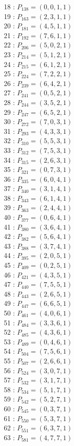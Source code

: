\documentclass{article}
\begin{document}
{\begin{multicols}{2}
18 : $P_{138}=( 0, 0, 1, 1 )$\\
19 : $P_{163}=( 2, 3, 1, 1 )$\\
20 : $P_{181}=( 4, 5, 1, 1 )$\\
21 : $P_{192}=( 7, 6, 1, 1 )$\\
22 : $P_{206}=( 5, 0, 2, 1 )$\\
23 : $P_{214}=( 5, 1, 2, 1 )$\\
24 : $P_{215}=( 6, 1, 2, 1 )$\\
25 : $P_{224}=( 7, 2, 2, 1 )$\\
26 : $P_{239}=( 6, 4, 2, 1 )$\\
27 : $P_{241}=( 0, 5, 2, 1 )$\\
28 : $P_{244}=( 3, 5, 2, 1 )$\\
29 : $P_{247}=( 6, 5, 2, 1 )$\\
30 : $P_{272}=( 7, 0, 3, 1 )$\\
31 : $P_{293}=( 4, 3, 3, 1 )$\\
32 : $P_{310}=( 5, 5, 3, 1 )$\\
33 : $P_{312}=( 7, 5, 3, 1 )$\\
34 : $P_{315}=( 2, 6, 3, 1 )$\\
35 : $P_{321}=( 0, 7, 3, 1 )$\\
36 : $P_{335}=( 6, 0, 4, 1 )$\\
37 : $P_{340}=( 3, 1, 4, 1 )$\\
38 : $P_{343}=( 6, 1, 4, 1 )$\\
39 : $P_{363}=( 2, 4, 4, 1 )$\\
40 : $P_{377}=( 0, 6, 4, 1 )$\\
41 : $P_{380}=( 3, 6, 4, 1 )$\\
42 : $P_{382}=( 5, 6, 4, 1 )$\\
43 : $P_{388}=( 3, 7, 4, 1 )$\\
44 : $P_{395}=( 2, 0, 5, 1 )$\\
45 : $P_{409}=( 0, 2, 5, 1 )$\\
46 : $P_{421}=( 4, 3, 5, 1 )$\\
47 : $P_{440}=( 7, 5, 5, 1 )$\\
48 : $P_{443}=( 2, 6, 5, 1 )$\\
49 : $P_{447}=( 6, 6, 5, 1 )$\\
50 : $P_{461}=( 4, 0, 6, 1 )$\\
51 : $P_{484}=( 3, 3, 6, 1 )$\\
52 : $P_{485}=( 4, 3, 6, 1 )$\\
53 : $P_{489}=( 0, 4, 6, 1 )$\\
54 : $P_{504}=( 7, 5, 6, 1 )$\\
55 : $P_{507}=( 2, 6, 6, 1 )$\\
56 : $P_{524}=( 3, 0, 7, 1 )$\\
57 : $P_{532}=( 3, 1, 7, 1 )$\\
58 : $P_{534}=( 5, 1, 7, 1 )$\\
59 : $P_{542}=( 5, 2, 7, 1 )$\\
60 : $P_{545}=( 0, 3, 7, 1 )$\\
61 : $P_{550}=( 5, 3, 7, 1 )$\\
62 : $P_{551}=( 6, 3, 7, 1 )$\\
63 : $P_{581}=( 4, 7, 7, 1 )$\\
\end{multicols}
}
\end{document}
